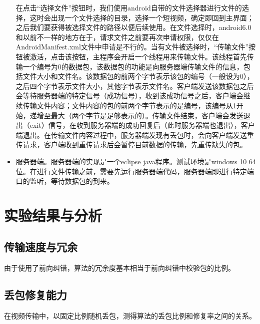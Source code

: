 \documentclass[onecolumn]{article}
\begin{document}
\begin{CJK*}{UTF8}{gbsn}
\begin{itemize}
在点击“选择文件”按钮时，我们使用android自带的文件选择器进行文件的选择，这时会出现一个文件选择的目录，选择一个短视频，确定即回到主界面；之后我们要获得被选择文件的路径以便后续使用。在文件选择时，android6.0和以前不一样的地方在于，请求文件之前要再次申请权限，仅仅在AndroidManifest.xml文件中申请是不行的。当有文件被选择时，“传输文件”按钮被激活，点击该按钮，主程序会开启一个线程用来传输文件。该线程首先传输一个编号为0的数据包，该数据包的功能是向服务器端传输文件的信息，包括文件大小和文件名。该数据包的前两个字节表示该包的编号（一般设为0），之后四个字节表示文件大小，其他字节表示文件名。客户端发送该数据包之后会等待服务器端的特定信号（成功信号），收到该成功信号之后，客户端会继续传输文件内容；文件内容的包的前两个字节表示的是编号，该编号从1开始，递增至最大（两个字节是足够表示的）。传输文件结束，客户端会发送退出（exit）信号，在收到服务器端的成功回复后（此时服务器端也退出），客户端退出。在传输文件内容过程中，服务器端发现有丢包时，会向客户端发送重传请求，客户端收到重传请求后会暂停目前数据的传输，先重传缺失的包。

\item 服务器端。服务器端的实现是一个eclipse java程序。测试环境是windows 10 64位。在进行文件传输之前，需要先运行服务器端代码，服务器端即进行特定端口的监听，等待数据包的到来。 
\end{itemize}

\section{实验结果与分析}
\subsection{传输速度与冗余}
由于使用了前向纠错，算法的冗余度基本相当于前向纠错中校验包的比例。
\subsection{丢包修复能力}
在视频传输中，以固定比例随机丢包，测得算法的丢包比例和修复率之间的关系。
\end{CJK*}
\end{document}
